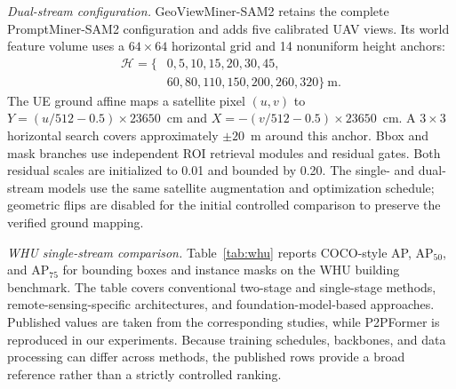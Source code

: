 \documentclass[letterpaper,journal]{IEEEtran}
\begin{document}
\noindent\textit{Dual-stream configuration.}
GeoViewMiner-SAM2 retains the complete PromptMiner-SAM2 configuration and adds five calibrated UAV views. Its world feature volume uses a $64\times64$ horizontal grid and 14 nonuniform height anchors:
\begin{equation}
\begin{split}
\mathcal{H}=\{&0,5,10,15,20,30,45,\\
&60,80,110,150,200,260,320\}\ \text{m}.
\end{split}
\end{equation}
The UE ground affine maps a satellite pixel $(u,v)$ to $Y=(u/512-0.5)\times23650$~cm and $X=-(v/512-0.5)\times23650$~cm. A $3\times3$ horizontal search covers approximately $\pm20$~m around this anchor. Bbox and mask branches use independent ROI retrieval modules and residual gates. Both residual scales are initialized to 0.01 and bounded by 0.20. The single- and dual-stream models use the same satellite augmentation and optimization schedule; geometric flips are disabled for the initial controlled comparison to preserve the verified ground mapping.

\noindent\textit{WHU single-stream comparison.}
\label{sec:whu}
Table~\ref{tab:whu} reports COCO-style AP, AP$_{50}$, and AP$_{75}$ for bounding boxes and instance masks on the WHU building benchmark. The table covers conventional two-stage and single-stage methods, remote-sensing-specific architectures, and foundation-model-based approaches. Published values are taken from the corresponding studies, while P2PFormer is reproduced in our experiments. Because training schedules, backbones, and data processing can differ across methods, the published rows provide a broad reference rather than a strictly controlled ranking.
\end{document}
